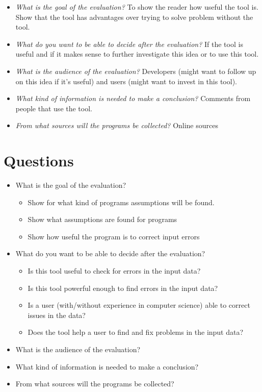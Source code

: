 \documentclass[11pt]{article}
\begin{document}
\begin{itemize}
  \item \textit{What is the goal of the evaluation?} To show the reader how useful the tool is. Show that the tool has advantages over trying to solve problem without the tool.
  \item \textit{What do you want to be able to decide after the evaluation?} If the tool is useful and if it makes sense to further investigate this idea or to use this tool.
  \item \textit{What is the audience of the evaluation?} Developers (might want to follow up on this idea if it's useful) and users (might want to invest in this tool).
  \item \textit{What kind of information is needed to make a conclusion?} Comments from people that use the tool.
  \item \textit{From what sources will the programs be collected?} Online sources
\end{itemize}

\section{Questions}


\begin{itemize}
  \item What is the goal of the evaluation?
  \begin{itemize}
    \item Show for what kind of programs assumptions will be found.
    \item Show what assumptions are found for programs
    \item Show how useful the program is to correct input errors
  \end{itemize}
  \item What do you want to be able to decide after the evaluation?
  \begin{itemize}
    \item Is this tool useful to check for errors in the input data?
    \item Is this tool powerful enough to find errors in the input data?
    \item Is a user (with/without experience in computer science) able to correct issues in the data?
    \item Does the tool help a user to find and fix problems in the input data?
  \end{itemize}
  \item What is the audience of the evaluation?
  \item What kind of information is needed to make a conclusion?
  \item From what sources will the programs be collected?
\end{itemize}
\end{document}

